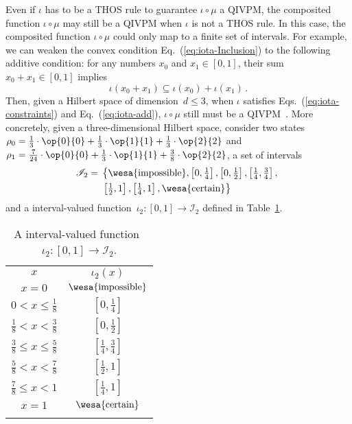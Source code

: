 \documentclass[english,reprint, aps, prl,superscriptaddress, showpacs,
showkeys, longbibliography, amsmath, amssymb, floatfix]{revtex4-1}
\theoremstyle{plain}
\theoremstyle{definition}
\newcommand{\imposs}{{\text{\wesa{impossible}}}}
\newcommand{\necess}{{\text{\wesa{certain}}}}
\newcommand{\proj}[1]{\op{#1}{#1}}
\begin{document}
Even if $\iota$ has to be a THOS rule to guarantee $\iota\circ\mu$
a QIVPM, the composited function $\iota\circ\mu$ may still be a QIVPM
when $\iota$ is not a THOS rule. In this case, the composited function
$\iota\circ\mu$ could only map to a finite set of intervals. For
example, we can weaken the convex condition Eq.~(\ref{eq:iota-Inclusion})
to the following additive condition: for any numbers $x_{0}$ and
$x_{1}\in\left[0,1\right]$, their sum $x_{0}+x_{1}\in\left[0,1\right]$
implies
\begin{equation}
\iota\left(x_{0}+x_{1}\right)\subseteq\iota\left(x_{0}\right)+\iota\left(x_{1}\right)\,.\label{eq:iota-add}
\end{equation}
Then, given a Hilbert space of dimension~$d\le3$, when $\iota$
satisfies Eqs.~(\ref{eq:iota-constraints}) and Eq.~(\ref{eq:iota-add}),
$\iota\circ\mu$ still must be a QIVPM~\citep{HOSTunpublished}.
More concretely, given a three-dimensional Hilbert space, consider
two states~$\rho_{0}=\frac{1}{3}\cdot\proj{0}+\frac{1}{3}\cdot\proj{1}+\frac{1}{3}\cdot\proj{2}$
and $\rho_{1}=\frac{7}{24}\cdot\proj{0}+\frac{1}{3}\cdot\proj{1}+\frac{3}{8}\cdot\proj{2}$,
a set of intervals
\begin{equation}
\begin{aligned}\mathscr{I}_{2}={} & \left\{ \imposs,\left[0,\tfrac{1}{4}\right],\left[0,{\textstyle \tfrac{1}{2}}\right],\left[\tfrac{1}{4},\tfrac{3}{4}\right],\right.\\
 & \left.\left[\tfrac{1}{2},1\right],\left[\tfrac{1}{4},1\right],\necess\right\} 
\end{aligned}
\end{equation}
and a interval-valued function~$\iota_{2}:\left[0,1\right]\rightarrow\mathscr{I}_{2}$
defined in Table~\ref{tab:I_2}.
\begin{table}
\caption{\label{tab:I_2}A interval-valued function~$\iota_{2}:\left[0,1\right]\rightarrow\mathscr{I}_{2}$.}
\centering{}%
\begin{tabular}{cc}
\toprule 
\addlinespace
$x$ & $\iota_{2}\left(x\right)$\tabularnewline\addlinespace
\midrule
\midrule 
\addlinespace
$x=0$ & $\imposs$\tabularnewline\addlinespace
\midrule 
\addlinespace
$0<x\le\tfrac{1}{8}$ & $\left[0,\tfrac{1}{4}\right]$\tabularnewline\addlinespace
\midrule 
\addlinespace
$\tfrac{1}{8}<x<\tfrac{3}{8}$ & $\left[0,{\textstyle \tfrac{1}{2}}\right]$\tabularnewline\addlinespace
\midrule 
\addlinespace
$\tfrac{3}{8}\le x\le\tfrac{5}{8}$ & $\left[\tfrac{1}{4},\tfrac{3}{4}\right]$\tabularnewline\addlinespace
\midrule 
\addlinespace
$\tfrac{5}{8}<x<\tfrac{7}{8}$ & $\left[\tfrac{1}{2},1\right]$\tabularnewline\addlinespace
\midrule 
\addlinespace
$\tfrac{7}{8}\le x<1$ & $\left[\tfrac{1}{4},1\right]$\tabularnewline\addlinespace
\midrule 
\addlinespace
$x=1$ & $\necess$\tabularnewline\addlinespace
\bottomrule
\end{tabular}
\end{table}
\end{document}

